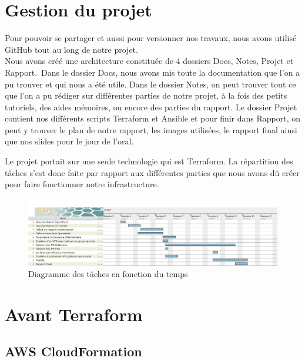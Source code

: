 \documentclass[]{article}
\begin{document}
\newpage
\section{Gestion du projet}\label{ruxe9partition-des-tuxe2ches-au-seins-du-groupe}

Pour pouvoir se partager et aussi pour versionner nos travaux, nous avons utilisé GitHub tout au long de notre projet. \\
Nous avons créé une architecture constituée de 4 dossiers Docs, Notes, Projet et Rapport.\
Dans le dossier Docs, nous avons mis toute la documentation que l'on a pu trouver et qui nous a été utile. Dans le dossier Notes, on peut trouver tout ce que l'on a pu rédiger sur différentes parties de notre projet, à la fois des petits tutoriels, des aides mémoires, ou encore des parties du rapport. Le dossier Projet contient nos différents scripts Terraform et Ansible et pour finir dans Rapport, on peut y trouver le plan de notre rapport, les images utilisées, le rapport final ainsi que nos slides pour le jour de l'oral.

Le projet portait sur une seule technologie qui est Terraform. La
répartition des tâches s'est donc faite par rapport aux différentes
parties que nous avons dû créer pour faire fonctionner notre
infrastructure.

\begin{figure}
\centering
\includegraphics{Images/TerraFormGant.png}
\caption{Diagramme des tâches en fonction du temps}
\end{figure}

\newpage
\section{Avant Terraform}\label{avant-terraform}

\subsection{AWS CloudFormation}\label{aws-cloudformation}
\end{document}
